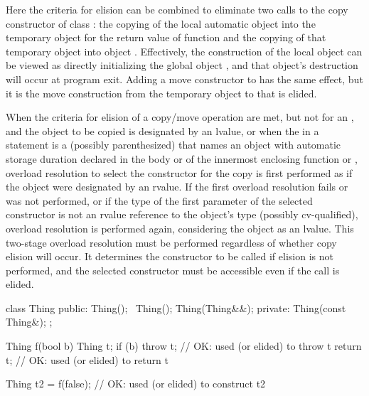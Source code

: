 Here the criteria for elision can be combined to
eliminate two calls to the copy constructor of class
:
the copying of the local automatic object
into the temporary object for the return value of
function
and the copying of that temporary object into object
.
Effectively, the construction of the local object
can be viewed as directly initializing the global
object
,
and that object's destruction will occur at program
exit.
Adding a move constructor to  has the same effect, but it is the
move construction from the temporary object to  that is elided.
\exitexample

\pnum
When the criteria for elision of a copy/move operation are met,
but not for an ,
and the object
to be copied is designated by an lvalue,
or when the  in a  statement
is a (possibly parenthesized) 
that names an object with automatic storage duration declared in the body
or  of the innermost enclosing
function or ,
overload resolution to select the constructor
for the copy is first performed as if the object were designated by an rvalue.
If the first overload resolution fails or was not performed,
or if the type of the first parameter of the selected
constructor is not an rvalue reference to the object's type (possibly cv-qualified),
overload resolution is performed again, considering the object as an lvalue.
\enternote This two-stage overload resolution must be performed regardless
of whether copy elision will occur. It determines the constructor to be called if
elision is not performed, and the selected constructor must be accessible even if
the call is elided. \exitnote

\enterexample
\begin{codeblock}
class Thing {
public:
  Thing();
  ~Thing();
  Thing(Thing&&);
private:
  Thing(const Thing&);
};

Thing f(bool b) {
  Thing t;
  if (b)
    throw t;                    // OK:  used (or elided) to throw t
  return t;                     // OK:  used (or elided) to return t
}

Thing t2 = f(false);            // OK:  used (or elided) to construct t2
\end{codeblock}
\exitexample
